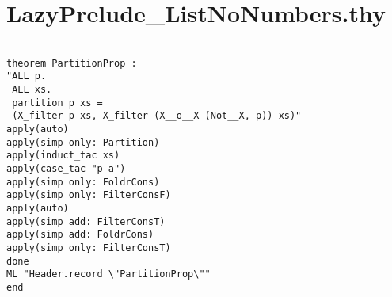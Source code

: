 \section{LazyPrelude\_ListNoNumbers.thy}
\label{appendix:lazyProofs:List}
\begin{multicols}{2}
\tiny
\begin{Verbatim}

theorem PartitionProp :
"ALL p.
 ALL xs.
 partition p xs =
 (X_filter p xs, X_filter (X__o__X (Not__X, p)) xs)"
apply(auto)
apply(simp only: Partition)
apply(induct_tac xs)
apply(case_tac "p a")
apply(simp only: FoldrCons)
apply(simp only: FilterConsF)
apply(auto)
apply(simp add: FilterConsT)
apply(simp add: FoldrCons)
apply(simp only: FilterConsT)
done
ML "Header.record \"PartitionProp\""
end
\end{Verbatim}
\end{multicols}

